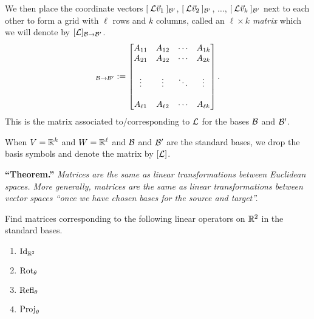 We then place the coordinate vectors $[\: \mathcal{L} \vec{v}_1 \:]_{\mathcal{B}'}$, $[\: \mathcal{L} \vec{v}_2 \:]_{\mathcal{B}'}$, $\ldots$, $[\: \mathcal{L} \vec{v}_k \:]_{\mathcal{B}'}$ next to each other to form a grid with $\ell$ rows and $k$ columns, called an \emph{$\ell \times k$ matrix} which we will denote by $[\mathcal{L}]_{\mathcal{B} \rightarrow \mathcal{B}'}$.
\begin{align*}
  [\call]_{\calb \rightarrow \calb'}
  := \begin{bmatrix}
    A_{11} & A_{12} & \cdots & A_{1k} \\
    A_{21} & A_{22} & \cdots & A_{2k} \\\\
    \vdots & \vdots & \ddots & \vdots \\\\
    A_{\ell 1} & A_{\ell 2} & \cdots & A_{\ell k}
  \end{bmatrix}.
\end{align*}
This is the {matrix associated to/corresponding to} $\mathcal{L}$ for the bases $\mathcal{B}$ and $\mathcal{B}'$.


When $V = \mathbb{R}^k$ and $W = \mathbb{R}^\ell$ and $\mathcal{B}$ and $\mathcal{B}'$ are the standard bases, we drop the basis symbols and denote the matrix by $[\mathcal{L}]$.

\textbf{``Theorem.''}\emph{ Matrices are the same as linear transformations between Euclidean spaces. More generally, matrices are the same as linear transformations between vector spaces ``once we have chosen bases for the source and target''.}

\begin{qbox}
  Find matrices corresponding to the following linear operators on $\mathbb{R}^2$ in the standard bases.
  \begin{multicols}{2}
    \begin{enumerate}
      \item $\operatorname{Id}_{\mathbb{R}^2}$
      \item $\mathrm{Rot}_{\theta}$
      \item $\mathrm{Refl}_{\theta}$
      \item $\mathrm{Proj}_{\theta}$
    \end{enumerate}
  \end{multicols}
\end{qbox}

